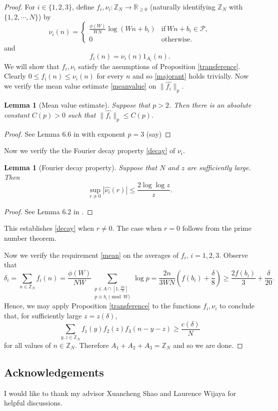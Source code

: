 \documentclass[a4paper,11pt,twoside]{amsart}
\newtheorem{lemma}[theorem]{Lemma}
\theoremstyle{definition}
\numberwithin{equation}{section}
\newcommand\R{\mathbb{R}}
\newcommand\Z{\mathbb{Z}}
\newcommand{\CP}{\mathcal{P}}
\begin{document}
\begin{proof}
For $i \in \{1,2,3\}$, define $f_i, \nu_i : \Z_N \rightarrow \R_{\geq 0}$ (naturally identifying $\Z_N$ with $\{1,2,\cdots,N\}$) by
$$ \nu_i(n) =
\begin{cases}
             \frac{\phi(W)}{WN}\log(Wn + b_i) &\text{if}\ Wn + b_i\in \CP, \\
 
     0 &\text{otherwise.}
\end{cases} $$
and
$$ f_i(n) = \nu_i(n)1_{A_i}(n). $$
We will show that $f_i,\nu_i$ satisfy the assumptions of Proposition \ref{transference}. Clearly $0 \leq f_i(n) \leq \nu_i(n)$ for every $n$ and so \eqref{majorant} holds trivially. Now we verify the mean value estimate \eqref{meanvalue} on $\|\widehat{f_i}\|_p.$
\begin{lemma}[Mean value estimate]
Suppose that $p > 2$. Then there is an absolute constant $C(p) > 0$ such that  $\|\widehat{f_i}\|_p \leq C(p).$
\end{lemma}
\begin{proof}
See Lemma 6.6 in \cite{Green} with exponent $p=3$ (say)
\end{proof}
Now we verify the the Fourier decay property \eqref{decay} of $\nu_i$.
\begin{lemma}[Fourier decay property]
Suppose that $N$ and $z$ are sufficiently large. Then $$\sup_{r \neq 0}|\hat{\nu_i}(r)| \leq \frac{2\log\log z}{z}.$$
\end{lemma}
\begin{proof}
    See Lemma 6.2 in \cite{Green}.
\end{proof}
This establishes \eqref{decay} when $r \neq 0$. The case when $r = 0$ follows from the prime number theorem.

Now we verify the requirement \eqref{mean} on the averages of $f_i$, $i = 1,2,3$. Observe that 
$$ \delta_i = \sum_{n \in \Z_N}f_i(n) = \frac{\phi(W)}{NW}\sum_{\substack{p \in A \cap [1,\frac{2n}{3}] \\ p \equiv b_i \pmod W}} \log{p} = \frac{2n}{3WN}(f(b_i) + \frac{\delta}{8}) \geq \frac{2f(b_i)}{3} + \frac{\delta}{20}.$$
Hence, we may apply Proposition \ref{transference} to the functions $f_i,\nu_i$ to  conclude that, for sufficiently large $z = z(\delta)$,
$$ \sum_{y,z \in \Z_N}f_1(y)f_2(z)f_3(n-y-z) \geq \frac{c(\delta)}{N}$$
for all values of $n \in \Z_N$. Therefore $A_1 + A_2 + A_3 = \Z_N$ and so we are done.
    
\end{proof}

\subsection*{Acknowledgements}
I would like to thank my advisor Xuancheng Shao and Laurence Wijaya for helpful discussions.






\end{document}
